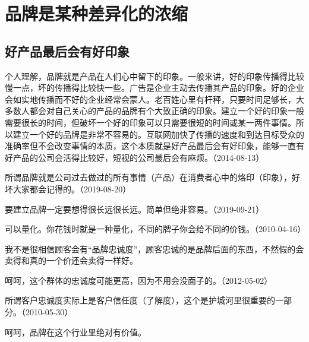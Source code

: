 
\section{品牌是某种差异化的浓缩}


\subsection{好产品最后会有好印象}

个人理解，品牌就是产品在人们心中留下的印象。一般来讲，好的印象传播得比较慢一点，坏的传播得比较快一些。广告是企业主动去传播其产品的印象。好的企业会如实地传播而不好的企业经常会蒙人。老百姓心里有杆秤，只要时间足够长，大多数人都会对自己关心的产品的品牌有个大致正确的印象。建立一个好的印象一般需要很长的时间，但破坏一个好的印象可以只需要很短的时间或某一两件事情。所以建立一个好的品牌是非常不容易的。互联网加快了传播的速度和到达目标受众的准确率但不会改变事情的本质，这个本质就是好产品最后会有好印象，能够一直有好产品的公司会活得比较好，短视的公司最后会有麻烦。（2014-08-13）

所谓品牌就是公司过去做过的所有事情（产品）在消费者心中的烙印（印象），好坏大家都会记得的。（2019-08-20）

要建立品牌一定要想得很长远很长远。简单但绝非容易。（2019-09-21）


可以量化。你花钱时就是一种量化，不同的牌子你会给不同的价钱。（2010-04-16）

我不是很相信顾客会有“品牌忠诚度”，顾客忠诚的是品牌后面的东西，不然假的会卖得和真的一个价还会卖得一样好。


呵呵，这个群体的忠诚度可能更高，因为不用会没面子的。（2012-05-02）

所谓客户忠诚度实际上是客户信任度（了解度），这个是护城河里很重要的一部分。（2010-05-30）


呵呵，品牌在这个行业里绝对有价值。

